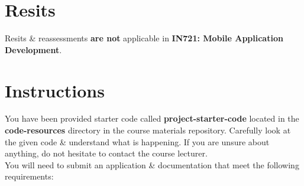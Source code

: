 \documentclass{article}
\begin{document}
\section*{Resits}
Resits \& reassessments \textbf{are not} applicable in \textbf{IN721: Mobile Application Development}. 

\section*{Instructions}
You have been provided starter code called \textbf{project-starter-code} located in the \textbf{code-resources} directory in the course materials repository. Carefully look at the given code \& understand what is happening. If you are unsure about anything, do not hesitate to contact the course lecturer. \\

You will need to submit an application \& documentation that meet the following requirements:
\end{document}

